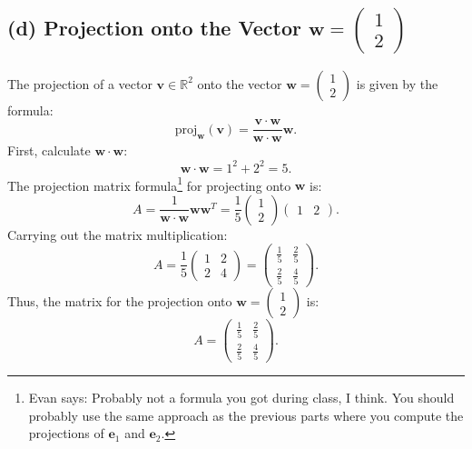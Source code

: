 \documentclass[11pt]{article}
\begin{document}
\subsection{(d) Projection onto the Vector \( \mathbf{w} = \begin{pmatrix} 1 \\ 2 \end{pmatrix} \)}

The projection of a vector \( \mathbf{v} \in \mathbb{R}^2 \) onto the vector \( \mathbf{w} = \begin{pmatrix} 1 \\ 2 \end{pmatrix} \) is given by the formula:
\[
\text{proj}_{\mathbf{w}}(\mathbf{v}) = \frac{\mathbf{v} \cdot \mathbf{w}}{\mathbf{w} \cdot \mathbf{w}} \mathbf{w}.
\]
First, calculate \( \mathbf{w} \cdot \mathbf{w} \):
\[
\mathbf{w} \cdot \mathbf{w} = 1^2 + 2^2 = 5.
\]
The projection matrix formula\footnote{Evan says:
    Probably not a formula you got during class, I think.
    You should probably use the same approach as the previous parts
    where you compute the projections of $\mathbf{e}_1$ and $\mathbf{e}_2$.}
for projecting onto \( \mathbf{w} \) is:
\[
A = \frac{1}{\mathbf{w} \cdot \mathbf{w}} \mathbf{w} \mathbf{w}^T = \frac{1}{5} \begin{pmatrix} 1 \\ 2 \end{pmatrix} \begin{pmatrix} 1 & 2 \end{pmatrix}.
\]
Carrying out the matrix multiplication:
\[
A = \frac{1}{5} \begin{pmatrix} 1 & 2 \\ 2 & 4 \end{pmatrix} = \begin{pmatrix} \frac{1}{5} & \frac{2}{5} \\ \frac{2}{5} & \frac{4}{5} \end{pmatrix}.
\]
Thus, the matrix for the projection onto \( \mathbf{w} = \begin{pmatrix} 1 \\ 2 \end{pmatrix} \) is:
\[
A = \begin{pmatrix} \frac{1}{5} & \frac{2}{5} \\ \frac{2}{5} & \frac{4}{5} \end{pmatrix}.
\]
\end{document}
